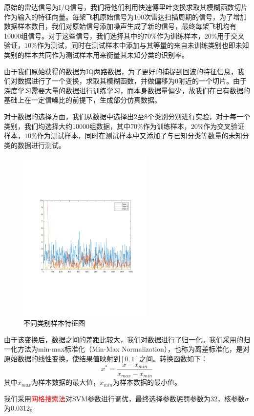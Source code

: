 原始的雷达信号为I/Q信号，我们将他们利用快速傅里叶变换求取其模糊函数切片作为输入的特征向量。每架飞机原始信号为100次雷达扫描周期的信号，为了增加数据样本数目，我们对原始信号添加噪声生成了新的信号，最终每架飞机均有10000组信号。对于这些信号，我们选择其中的$70\%$作为训练样本，$20\%$用于交叉验证，$10\%$作为测试，同时在测试样本中添加与其等量的来自未训练类别也即未知类别的样本共同作为测试样本用来衡量其未知分类的识别率。

由于我们原始获得的数据为IQ两路数据，为了更好的捕捉到回波的特征信息，我们对数据进行了一个变换，求取其模糊函数，并做偏移为0附近的一个切片。由于深度学习需要大量的数据进行训练学习，而本身数据量偏少，故我们在已有数据的基础上在一定信噪比的前提下，生成部分仿真数据。

对于数据的选择方面，我们从数据中选择出2至8个类别分别进行实验，对于每一个类别，我们均选择大约10000组数据，其中$70\%$作为训练样本，$20\%$作为交叉验证样本，$10\%$作为测试样本，同时在测试样本中又添加了与已知分类等数量的未知分类的数据进行测试。
\begin{figure}[H]
	\centering
	\includegraphics[width=6.67cm]{figures/diff_data.pdf}
	\caption{不同类别样本特征图}
\end{figure}
由于该变换后，数据之间的差距比较大，我们对数据进行了归一化。我们采用的归一化方法为min-max标准化（Min-Max Normalization），也称为离差标准化，是对原始数据的线性变换，使结果值映射到$[0 , 1]$之间。转换函数如下：
\begin{equation}
x^{*}=\frac{x-x_{min}}{x_{max}-x_{min}}
\end{equation}
其中$x_{max}$为样本数据的最大值，$x_{min}$为样本数据的最小值。

我们采用\textcolor{red}{网格搜索法}对SVM参数进行调优，最终选择参数惩罚参数为32，核参数$\sigma$为0.0312。

